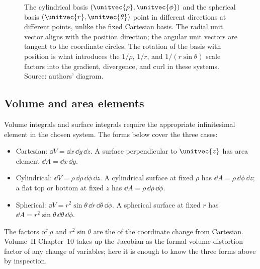 \begin{figure}[h]
  \centering
  
  \caption[Curvilinear basis vectors turn with position.]{The
  cylindrical basis $(\unitvec{\rho}, \unitvec{\phi})$ and the
  spherical basis $(\unitvec{r}, \unitvec{\theta})$ point in different
  directions at different points, unlike the fixed Cartesian basis. The
  radial unit vector aligns with the position direction; the angular
  unit vectors are tangent to the coordinate circles. The rotation of
  the basis with position is what introduces the $1/\rho$, $1/r$, and
  $1/(r\sin\theta)$ scale factors into the gradient, divergence, and
  curl in these systems. Source: authors' diagram.}
  \label{fig:vol02:ch08:curvilinear-basis}
\end{figure}

\subsection{Volume and area elements}

Volume integrals and surface integrals require the appropriate
infinitesimal element in the chosen system. The forms below cover
the three cases:

\begin{itemize}[leftmargin=*]
  \item Cartesian: $\dd V = \dd x \,\dd y \,\dd z$. A surface
    perpendicular to $\unitvec{z}$ has area element $\dd A = \dd x
    \,\dd y$.
  \item Cylindrical: $\dd V = \rho \,\dd\rho \,\dd\phi \,\dd z$. A
    cylindrical surface at fixed $\rho$ has $\dd A = \rho \,\dd\phi
    \,\dd z$; a flat top or bottom at fixed $z$ has $\dd A = \rho
    \,\dd\rho \,\dd\phi$.
  \item Spherical: $\dd V = r^{2} \sin\theta \,\dd r \,\dd\theta \,
    \dd\phi$. A spherical surface at fixed $r$ has $\dd A = r^{2}
    \sin\theta \,\dd\theta \,\dd\phi$.
\end{itemize}

The factors of $\rho$ and $r^{2}\sin\theta$ are the
 of the coordinate change from
Cartesian. Volume~II Chapter~10 takes up the Jacobian as the formal
volume-distortion factor of any change of variables; here it is
enough to know the three forms above by inspection.

